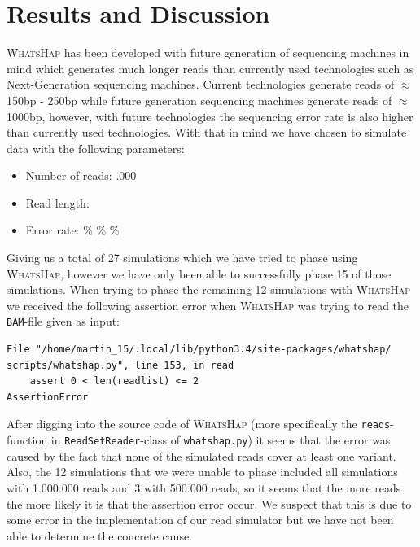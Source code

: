 \documentclass[10pt,a4paper]{article}
\begin{document}
\section{Results and Discussion}
\textsc{WhatsHap} has been developed with future generation of sequencing machines in mind which generates much longer reads than currently used technologies such as Next-Generation sequencing machines. Current technologies generate reads of $\approx$ 150bp - 250bp while future generation sequencing machines generate reads of $\approx$ 1000bp, however, with future technologies the sequencing error rate is also higher than currently used technologies. With that in mind we have chosen to simulate data with the following parameters:
\begin{itemize}
\item Number of reads:
.000
\item Read length:
\item Error rate:
\%
\%
\%
\end{itemize}
Giving us a total of 27 simulations which we have tried to phase using \textsc{WhatsHap}, however we have only been able to successfully phase 15 of those simulations. When trying to phase the remaining 12 simulations with \textsc{WhatsHap} we received the following assertion error when \textsc{WhatsHap} was trying to read the \texttt{BAM}-file given as input:
\begin{lstlisting}
File "/home/martin_15/.local/lib/python3.4/site-packages/whatshap/ scripts/whatshap.py", line 153, in read
    assert 0 < len(readlist) <= 2
AssertionError
\end{lstlisting}
After digging into the source code of \textsc{WhatsHap} (more specifically the \texttt{reads}-function in \texttt{ReadSetReader}-class of \texttt{whatshap.py}) it seems that the error was caused by the fact that none of the simulated reads cover at least one variant. Also, the 12 simulations that we were unable to phase included all simulations with 1.000.000 reads and 3 with 500.000 reads, so it seems that the more reads the more likely it is that the assertion error occur. We suspect that this is due to some error in the implementation of our read simulator but we have not been able to determine the concrete cause.
\end{document}
